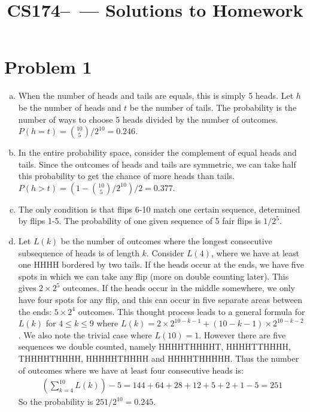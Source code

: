 \documentclass[11pt]{article}
\title{CS174--\Session\  --- Solutions to Homework \Homework}
\author{\Name}
\begin{document}
\maketitle
{}
\setcounter{problemnumber}{0}

\section*{Problem 1}
\begin{enumerate}[(a)]
\item When the number of heads and tails are equals, this is simply 5 heads. Let $h$ be the number of heads and $t$ be the number of tails. The probability is the number of ways to choose 5 heads divided by the number of outcomes. $P(h=t) = {10 \choose 5}/ 2^{10} = 0.246$.
\item In the entire probability space, consider the complement of equal heads and tails. Since the outcomes of heads and tails are symmetric, we can take half this probability to get the chance of more heads than tails. $P(h>t) = (1-{10 \choose 5}/ 2^{10})/2 = 0.377$.
\item The only condition is that flips 6-10 match one certain sequence, determined by flips 1-5. The probability of one given sequence of 5 fair flips is $1/2^5$.
\item Let $L(k)$ be the number of outcomes where the longest consecutive subsequence of heads is of length $k$. Consider $L(4)$, where we have at least one HHHH bordered by two tails. If the heads occur at the ends, we have five spots in which we can take any flip (more on double counting later). This gives $2\times 2^5$ outcomes. If the heads occur in the middle somewhere, we only have four spots for any flip, and this can occur in five separate areas between the ends: $5\times 2^4$ outcomes. This thought process leads to a general formula for $L(k)$ for $4\leq k \leq 9$ where $L(k) = 2\times 2^{10-k-1} + (10-k-1)\times 2^{10-k-2}$. We also note the trivial case where $L(10)=1$. However there are five sequences we double counted, namely HHHHTHHHHT, HHHHTTHHHH, THHHHTHHHH, HHHHHTHHHH and HHHHTHHHHH. Thus the number of outcomes where we have at least four consecutive heads is:
\begin{align*}
(\sum_{k=4}^{10} L(k)) - 5 = 144 + 64 + 28 + 12 + 5 + 2 + 1 - 5 = 251
\end{align*}
So the probability is $251/2^{10} = 0.245$.
\end{enumerate}
\end{document}
